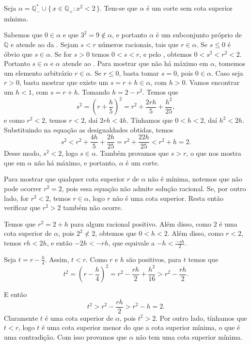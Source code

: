 \documentclass[../main.tex]{subfiles}
\begin{document}
\begin{prop}
    Seja $\alpha = \mathbb{Q}_{-}^* \cup \{\, x \in \mathbb{Q}_{+} : x^2 < 2 \,\}$. Tem-se que $\alpha$ é um corte sem cota superior mínima.
\end{prop}
\begin{dem}
   Sabemos que $0 \in \alpha$ e que $3^2 = 9 \not\in \alpha$, e portanto $\alpha$ é um subconjunto próprio de $\mathbb{Q}$ e atende ao  da . 
   Sejam $s < r$ números racionais, tais que $r \in \alpha$. Se $s \leq 0$ é óbvio que $s \in \alpha$. Se for $s > 0$ temos $0 < s < r$, e pelo
   , obtemos $0 < s^2 < r^2 < 2$. Portanto $s \in \alpha$ e $\alpha$ atende ao .
   Para mostrar que não há máximo em $\alpha$, tomemos um elemento arbitrário $r \in \alpha$. Se $r \leq 0$, basta tomar $s = 0$, pois $0 \in \alpha$. Caso seja $r > 0$, basta mostrar que existe um $s = r + h \in \alpha$, com $h > 0$. Vamos encontrar um $h < 1$, com $s=r+h$. 
   Tomando $h = 2 - r^2$. Temos que
   \[ s^2 = \left( r+ \frac{h}{5} \right)^2 = r^2 + \frac{2rh}{5}+ \frac{h^2}{25}, \]
    e como $r^2 < 2$, temos $r<2$, daí $2rh < 4h$. Tínhamos que $0 < h < 2$, daí $h^2 < 2h$. Substituindo na equação as desigualdades obtidas, temos
    \[ s^2 < r^2 + \frac{4h}{5} + \frac{2h}{25}  = r^2 + \frac{22h}{25} < r^2 + h = 2. \]
    Desse modo, $s^2 < 2$, logo $s \in \alpha$. Também provamos que $s>r$, o que nos mostra que em $\alpha$ não há máximo, e portanto, $\alpha$ é um corte.

    Para mostrar que qualquer cota superior $r$ de $\alpha$ não é mínima, notemos que não pode ocorrer $r^2 = 2$, pois essa equação não admite solução racional. Se, por outro lado, for $r^2<2$, temos $r \in \alpha$, logo $r$ não é uma cota superior. Resta então verificar que $r^2 > 2$ também não ocorre. 

    Temos que $r^2 = 2+ h$ para algum racional positivo. Além disso, como $2$ é uma cota superior de $\alpha$, pois $2^2 \not< 2$, obtemos que $0 < h < 2$. Além disso, como $r < 2$, temos $rh < 2h$, e então $-2h < -rh$, que equivale a $-h < \frac{-sh}{2}$.
    
    Seja $t = r - \frac{h}{4}$. Assim, $t < r$. Como $r$ e $h$ são positivos, para $t$ temos que
    \[ t^2 = \left( r - \frac{h}{4} \right)^2 = r^2 - \frac{rh}{2} + \frac{h^2}{16} > r^2 - \frac{rh}{2}. \]

    E então
    \[ t^2 > r^2 - \frac{rh}{2} > r^2-h = 2. \]
    Claramente $t$ é uma cota superior de $\alpha$, pois $t^2 >  2$. Por outro lado, tínhamos que $t < r$, logo $t$ é uma cota superior menor do que a cota superior mínima, o que é uma contradição. Com isso provamos que $\alpha$ não tem uma cota superior mínima. 
\end{dem}
\end{document}
